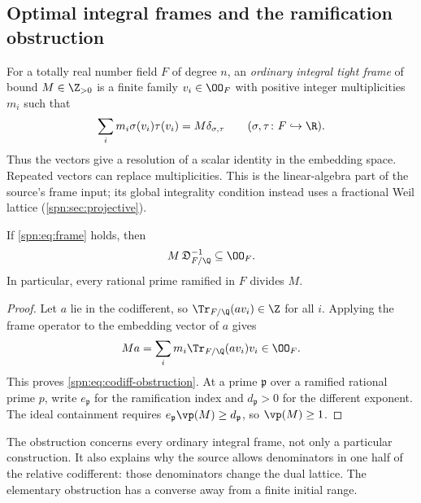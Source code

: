 \subsection{Optimal integral frames and the ramification obstruction}\label{spn:sec:frames}

For a totally real number field $F$ of degree $n$, an \emph{ordinary integral
tight frame} of bound $M\in\Z_{>0}$ is a finite family $v_i\in\OO_F$ with
positive integer multiplicities $m_i$ such that
\begin{equation}\label{spn:eq:frame}
 \sum_im_i\sigma(v_i)\tau(v_i)=M\delta_{\sigma,\tau}
 \qquad(\sigma,\tau\colon F\hookrightarrow\R).
\end{equation}
Thus the vectors give a resolution of a scalar identity in the embedding
space. Repeated vectors can replace multiplicities. This is the linear-algebra
part of the source's frame input; its global integrality condition instead
uses a fractional Weil lattice (\cref{spn:sec:projective}).

\begin{theorem}\label{spn:thm:dual-obstruction}
If \eqref{spn:eq:frame} holds, then
\begin{equation}\label{spn:eq:codiff-obstruction}
 M\,\spnDD_{F/\Q}^{-1}\subseteq\OO_F .
\end{equation}
In particular, every rational prime ramified in $F$ divides $M$.
\end{theorem}

\begin{proof}
Let $a$ lie in the codifferent, so $\Tr_{F/\Q}(av_i)\in\Z$ for all $i$.
Applying the frame operator to the embedding vector of $a$ gives
\[
 Ma=\sum_im_i\Tr_{F/\Q}(av_i)v_i\in\OO_F .
\]
This proves \eqref{spn:eq:codiff-obstruction}. At a prime $\mathfrak p$ over a
ramified rational prime $p$, write $e_{\mathfrak p}$ for the ramification
index and $d_{\mathfrak p}>0$ for the different exponent. The ideal
containment requires $e_{\mathfrak p}\vp(M)\ge d_{\mathfrak p}$, so
$\vp(M)\ge1$.
\end{proof}

The obstruction concerns every ordinary integral frame, not only a particular
construction. It also explains why the source allows denominators in one half
of the relative codifferent: those denominators change the dual lattice. The
elementary obstruction has a converse away from a finite initial range.

